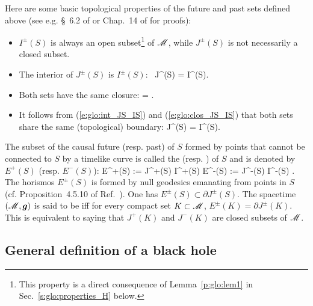 Here are some basic topological properties of the future and past sets
defined above (see e.g. \S~6.2 of \cite{HawkiE73} or Chap.~14 of
\cite{ONeil83} for proofs):
\begin{itemize}
\item
$I^\pm(S)$ is always an open subset\footnote{This property is a direct
consequence of Lemma~\ref{p:glo:lem1} in Sec.~\ref{s:glo:properties_H} below.} of $\mathscr{M}$, while
$J^\pm(S)$ is not necessarily a closed subset.
\item The interior of $J^\pm(S)$ is $I^\pm(S)$:
\be \label{e:glo:int_JS_IS}
    \, J^\pm(S) = I^\pm(S).
\ee
\item Both sets have the same closure:
\be \label{e:glo:clos_JS_IS}
     =  .
\ee
\item
It follows from (\ref{e:glo:int_JS_IS}) and (\ref{e:glo:clos_JS_IS})
that both sets share the same (topological) boundary:
\be \label{e:glo:boundary_JS_IS}
    \partial J^\pm(S) = \partial I^\pm(S).
\ee
\end{itemize}
The subset of the causal future (resp. past) of $S$ formed by points that cannot be connected
to $S$ by a timelike curve is called the 
(resp. )
of $S$ and is denoted by $E^+(S)$ (resp. $E^-(S)$):
\be
    E^+(S) :=  J^+(S) \setminus I^+(S) \qand
    E^-(S) :=  J^-(S) \setminus I^-(S) .
\ee
The horismos $E^\pm(S)$ is formed by null geodesics emanating from points in $S$
(cf. Proposition~4.5.10 of Ref.~\cite{HawkiE73}).
One has $E^\pm(S) \subset \partial J^\pm(S)$.
The spacetime $(\mathscr{M},\bm{g})$
is said to be 
iff for every compact set $K\subset \mathscr{M}$, $E^\pm(K) = \partial J^\pm(K)$. This is
equivalent to saying that $J^+(K)$ and $J^-(K)$ are closed subsets of $\mathscr{M}$.

\subsection{General definition of a black hole} \label{s:glo:def_BH}

